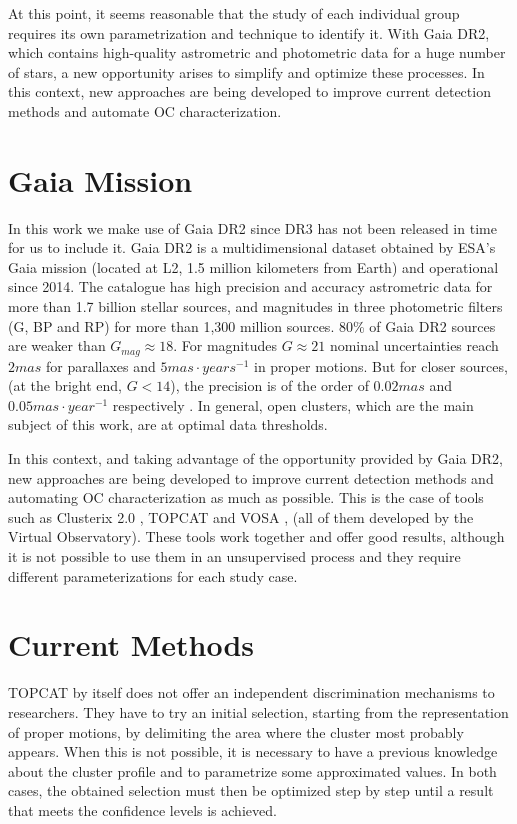 \documentclass[11pt, a4paper, english]{book}
\begin{document}
At this point, it seems reasonable that the study of each individual group requires its own parametrization and technique
to identify it. With Gaia DR2, which contains high-quality astrometric and photometric data for a huge number of stars,
a new opportunity arises to simplify and optimize these processes. In this context, new approaches are being developed
to improve current detection methods and automate OC characterization.

\section{Gaia Mission}

In this work we make use of Gaia DR2 since DR3 has not been released in time for us to include it.
Gaia DR2 is a multidimensional dataset obtained by ESA's Gaia mission (located at L2, 1.5 million kilometers from Earth) and
operational since 2014. The catalogue has high precision and accuracy astrometric data for more than 1.7 billion stellar sources,
and magnitudes in three photometric filters (G, BP and RP) for more than 1,300 million sources.
80\% of Gaia DR2 sources are weaker than $G_{mag} \approx 18$.
For magnitudes $G \approx 21$ nominal uncertainties reach $2 mas$ for parallaxes and $5 mas \cdot years^{-1}$ in proper motions.
But for closer sources, (at the bright end, $G < 14$), the precision is of the order of $0.02 mas$
and $0.05 mas \cdot year^{-1}$ respectively \cite{cantat2018gaia}.
In general, open clusters, which are the main subject of this work, are at optimal data thresholds.

In this context, and taking advantage of the opportunity provided by Gaia DR2,
new approaches are being developed to improve current detection methods and automating OC characterization as much as possible.
This is the case of tools such as Clusterix 2.0 \cite{balaguer2020clusterix}, TOPCAT \cite{taylor2005topcat}
and VOSA \cite{bayo2008vosa}, (all of them developed by the Virtual Observatory).
These tools work together and offer good results,
although it is not possible to use them in an unsupervised process and they require different parameterizations for each study case.

\section{Current Methods}

TOPCAT by itself does not offer an independent discrimination mechanisms to researchers.
They have to try an initial selection, starting from the representation of proper motions,
by delimiting the area where the cluster most probably appears.
When this is not possible, it is necessary to have a previous knowledge about the cluster profile
and to parametrize some approximated values.
In both cases, the obtained selection must then be optimized step by step
until a result that meets the confidence levels is achieved.
\end{document}
